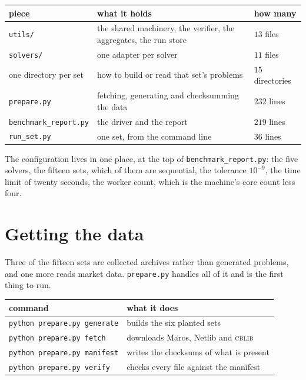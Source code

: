 \documentclass[a4paper,11pt]{book}
\theoremstyle{plain}
\theoremstyle{definition}
\theoremstyle{remark}
\numberwithin{equation}{chapter}
\numberwithin{algorithm}{chapter}
\begin{document}
	\begin{table}[H]
		\centering\small
		\begin{tabular}{lll}
			\toprule
			piece & what it holds & how many\\
			\midrule
			\texttt{utils/} & the shared machinery, the verifier, the aggregates,
			the run store & $13$ files\\
			\texttt{solvers/} & one adapter per solver & $11$ files\\
			one directory per set & how to build or read that set's problems
			& $15$ directories\\
			\texttt{prepare.py} & fetching, generating and checksumming the data
			& $232$ lines\\
			\texttt{benchmark\_report.py} & the driver and the report
			& $219$ lines\\
			\texttt{run\_set.py} & one set, from the command line & $36$ lines\\
			\bottomrule
		\end{tabular}
	\end{table}

	The configuration lives in one place, at the top of
	\texttt{benchmark\_report.py}: the five solvers, the fifteen sets, which of
	them are sequential, the tolerance $10^{-9}$, the time limit of twenty
	seconds, the worker count, which is the machine's core count less four.
	
	\section{Getting the data}

	Three of the fifteen sets are collected archives rather than generated
	problems, and one more reads market data. \texttt{prepare.py} handles all of
	it and is the first thing to run.

	\begin{table}[H]
		\centering\small
		\begin{tabular}{ll}
			\toprule
			command & what it does\\
			\midrule
			\texttt{python prepare.py generate} & builds the six planted sets\\
			\texttt{python prepare.py fetch} & downloads Maros, Netlib and
			\textsc{cblib}\\
			\texttt{python prepare.py manifest} & writes the checksums of what is
			present\\
			\texttt{python prepare.py verify} & checks every file against the
			manifest\\
			\bottomrule
		\end{tabular}
	\end{table}
\end{document}
